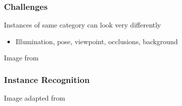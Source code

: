 \documentclass[xetex,professionalfont]{beamer}
\begin{document}

\begin{frame}
\frametitle{Challenges}

Instances of same category can look very differently
\begin{itemize}
    \item Illumination, pose, viewpoint, occlusions, background
\end{itemize}

\begin{center}
    {\centering Image from \cite{grauman2011}}
\end{center}

\end{frame}


\begin{frame}
\frametitle{Instance Recognition}

\begin{center}
    {\centering Image adapted from \cite{brown2007}}
\end{center}

\end{frame}

\end{document}
